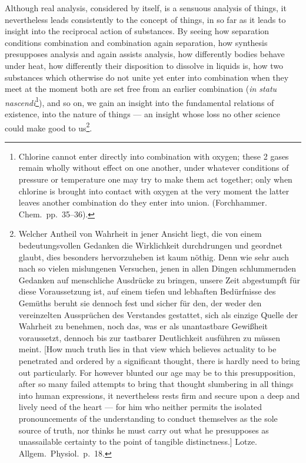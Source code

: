 \documentclass[12pt,a4paper]{book}
\begin{document}
Although real analysis, considered by itself, is a sensuous analysis of things,
it nevertheless leads consistently to the concept of things, in so far as it
leads to insight into the reciprocal action of substances.
\setcounter{footnote}{0}
By seeing how separation conditions combination and combination again
separation, how synthesis presupposes analysis and again assists analysis, how
differently bodies behave under heat, how
differently their disposition to dissolve in liquids is, how two substances
which otherwise do not unite yet enter into combination when they meet at the
moment both are set free from an earlier combination (\textit{in statu
nascendi}\footnote{Chlorine cannot enter directly into combination with oxygen;
these 2 gases remain wholly without effect on one another, under whatever
conditions of pressure or temperature one may try to make them act together;
only when chlorine is brought into contact with oxygen at the very moment the
latter leaves another combination do they enter into union. (Forchhammer.
Chem.\ pp.~35--36).}), and so on, we gain an insight into the fundamental
relations of existence, into the nature of things --- an insight whose loss no
other science could make good to us\footnote{Welcher Antheil von Wahrheit in
jener Ansicht liegt, die von
einem bedeutungsvollen Gedanken die Wirklichkeit durchdrungen
und geordnet glaubt, dies besonders hervorzuheben ist kaum nöthig.
Denn wie sehr auch nach so vielen mislungenen Versuchen, jenen
in allen Dingen schlummernden Gedanken auf menschliche
Ausdrücke zu bringen, unsere Zeit abgestumpft für diese Voraussetzung
ist, auf einem tiefen und lebhaften Bedürfnisse des Gemüths
beruht sie dennoch fest und sicher für den, der weder den vereinzelten
Aussprüchen des Verstandes gestattet, sich als einzige Quelle
der Wahrheit zu benehmen, noch das, was er als unantastbare
Gewißheit voraussetzt, dennoch bis zur tastbarer Deutlichkeit
ausführen zu müssen meint. [How much truth lies in that view which believes
actuality to be penetrated and ordered by a significant thought, there is
hardly need to bring out particularly. For however blunted our age may be to
this presupposition, after so many failed attempts to bring that thought
slumbering in all things into human expressions, it nevertheless rests firm and
secure upon a deep and lively need of the heart --- for him who neither permits
the isolated pronouncements of the understanding to conduct themselves as the
sole source of truth, nor thinks he must carry out what he presupposes as
unassailable certainty to the point of tangible distinctness.] Lotze. Allgem.\
Physiol.\ p.~18.}.
\end{document}
